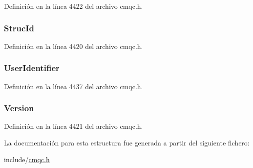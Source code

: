 Definición en la línea 4422 del archivo cmqc.\+h.

\hypertarget{structtag_m_q_m_d_a0530922ca944569b52601d74941f96e4}{}
\subsubsection[{Struc\+Id}]{ Struc\+Id}\label{structtag_m_q_m_d_a0530922ca944569b52601d74941f96e4}


Definición en la línea 4420 del archivo cmqc.\+h.

\hypertarget{structtag_m_q_m_d_a46cc458e507d74cea87ed00b97695f65}{}
\subsubsection[{User\+Identifier}]{ User\+Identifier}\label{structtag_m_q_m_d_a46cc458e507d74cea87ed00b97695f65}


Definición en la línea 4437 del archivo cmqc.\+h.

\hypertarget{structtag_m_q_m_d_a0656ef8f766b3907d394d88a35d7b7e9}{}
\subsubsection[{Version}]{ Version}\label{structtag_m_q_m_d_a0656ef8f766b3907d394d88a35d7b7e9}


Definición en la línea 4421 del archivo cmqc.\+h.



La documentación para esta estructura fue generada a partir del siguiente fichero\+:\begin{DoxyCompactItemize}
\item 
include/\hyperlink{cmqc_8h}{cmqc.\+h}\end{DoxyCompactItemize}
